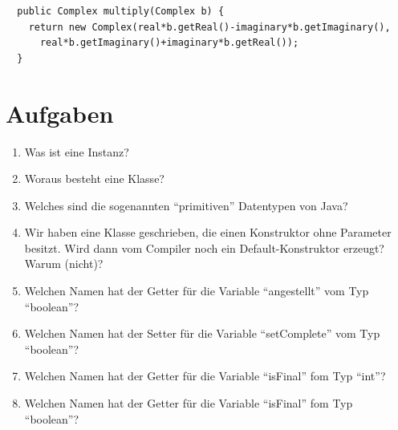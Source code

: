 \begin{lstlisting}
  public Complex multiply(Complex b) {
    return new Complex(real*b.getReal()-imaginary*b.getImaginary(),
      real*b.getImaginary()+imaginary*b.getReal());
  }
\end{lstlisting}

\section{Aufgaben}
\begin{enumerate}
\item Was ist eine Instanz?
\item Woraus besteht eine Klasse?
\item Welches sind die sogenannten "`primitiven"' Datentypen von Java?
\item Wir haben eine Klasse geschrieben, die einen Konstruktor ohne Parameter besitzt. Wird dann vom Compiler noch ein Default-Konstruktor erzeugt? Warum (nicht)?
\item Welchen Namen hat der Getter für die Variable "`angestellt"' vom Typ "`boolean"'?
\item Welchen Namen hat der Setter für die Variable "`setComplete"' vom Typ "`boolean"'?
\item Welchen Namen hat der Getter für die Variable "`isFinal"' fom Typ "`int"'?
\item Welchen Namen hat der Getter für die Variable "`isFinal"' fom Typ "`boolean"'?
\end{enumerate}




